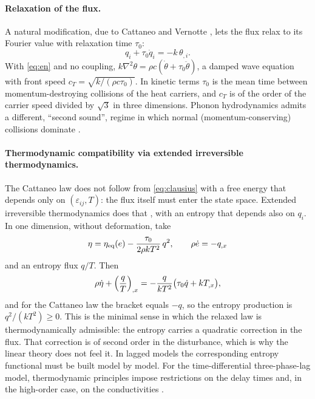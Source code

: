 \paragraph{Relaxation of the flux.} A natural modification, due to Cattaneo and Vernotte \citep{Cattaneo1948,Vernotte1958}, lets the flux relax to its Fourier value with relaxation time $\tau_0$:
\begin{equation}
q_i+\tau_0\dot q_i=-k\,\theta_{,i}.\label{eq:cattaneo}
\end{equation}
With \eqref{eq:en} and no coupling, $k\nabla^2\theta=\rho c(\dot\theta+\tau_0\ddot\theta)$, a damped wave equation with front speed $c_T=\sqrt{k/(\rho c\tau_0)}$. In kinetic terms $\tau_0$ is the mean time between momentum-destroying collisions of the heat carriers, and $c_T$ is of the order of the carrier speed divided by $\sqrt3$ in three dimensions. Phonon hydrodynamics admits a different, ``second sound'', regime in which normal (momentum-conserving) collisions dominate \citep{GuyerKrumhansl1966,GuyerKrumhansl1966II,Chester1963}.

\paragraph{Thermodynamic compatibility via extended irreversible thermodynamics.} The Cattaneo law does not follow from \eqref{eq:clausius} with a free energy that depends only on $(\varepsilon_{ij},T)$: the flux itself must enter the state space. Extended irreversible thermodynamics does that \citep{Jou2010,MuellerRuggeri1998,Mueller1967}, with an entropy that depends also on $q_i$. In one dimension, without deformation, take
\begin{equation}
\eta=\eta_{\rm eq}(e)-\frac{\tau_0}{2\rho kT^2}\,q^2,\qquad \rho\dot e=-q_{,x}
\end{equation}
and an entropy flux $q/T$. Then
\begin{equation}
\rho\dot\eta+\Bigl(\frac qT\Bigr)_{,x}=-\frac{q}{kT^2}\bigl(\tau_0\dot q+kT_{,x}\bigr),
\end{equation}
and for the Cattaneo law the bracket equals $-q$, so the entropy production is $q^2/(kT^2)\ge0$. This is the minimal sense in which the relaxed law is thermodynamically admissible: the entropy carries a quadratic correction in the flux. That correction is of second order in the disturbance, which is why the linear theory does not feel it. In lagged models the corresponding entropy functional must be built model by model. For the time-differential three-phase-lag model, thermodynamic principles impose restrictions on the delay times and, in the high-order case, on the conductivities \citep{Chirita2016,Chirita2017}.

